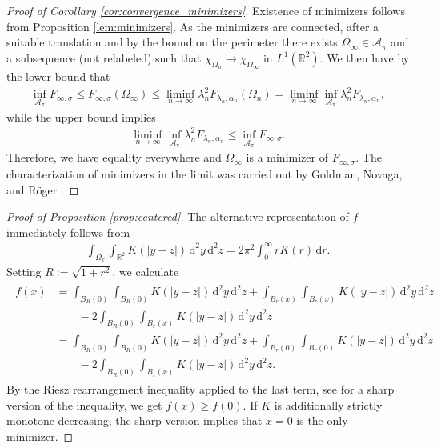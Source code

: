 \documentclass[11pt]{article}
\numberwithin{statement}{section}
\numberwithin{equation}{section}
\theoremstyle{remark}
\newcommand{\R}{\mathbb R} 				%
\newcommand{\intd}{\, \mathrm{d}} 				%
\begin{document}
\begin{proof}[Proof of Corollary \ref{cor:convergence_minimizers}]
  Existence of minimizers follows from Proposition
  \ref{lem:minimizers}.  As the minimizers are connected, after a
  suitable translation and by the bound on the perimeter there exists
  $\Omega_\infty \in \mathcal{A}_\pi$ and a subsequence (not
  relabeled) such that $\chi_{\Omega_n} \to \chi_{\Omega_\infty}$ in
  $L^1(\R^2)$.  We then have by the lower bound that
	\begin{align}
		\inf_{\mathcal{A}_\pi} F_{\infty,\sigma} \leq
          F_{\infty,\sigma}(\Omega_\infty)  \leq \liminf_{n \to
          \infty} \lambda_n^2 F_{\lambda_n, \alpha_n}(\Omega_n) =
          \liminf_{n \to \infty} \inf_{\mathcal{A}_\pi} \lambda_n^2
          F_{\lambda_n, \alpha_n}, 
	\end{align}
	while the upper bound implies
	\begin{align}
          \liminf_{n \to \infty} \inf_{\mathcal{A}_\pi} \lambda_n^2
          F_{\lambda_n, \alpha_n} \leq \inf_{\mathcal{A}_\pi}
          F_{\infty,\sigma}. 
	\end{align}
	Therefore, we have equality everywhere and $\Omega_\infty$ is
        a minimizer of $F_{\infty,\sigma}$.  The characterization of
        minimizers in the limit was carried out by Goldman, Novaga,
        and R{\"o}ger \cite{goldman2020quantitative}.
\end{proof}

\begin{proof}[Proof of Proposition \ref{prop:centered}]
  	The alternative representation of $f$ immediately follows from
	\begin{align}
          \int_{\Omega_x} \int_{\R^2}  K( |y-z|) \intd^2 y \intd^2 z =
          2\pi^2 \int_0^\infty rK(r) \intd r. 
	\end{align}
  	Setting $R := \sqrt{1 + r^2}$, we calculate
	\begin{align}
	  \begin{split}
            f(x) & = \int_{B_R(0)} \int_{B_R(0)} K( |y-z|) \intd^2 y
            \intd^2 z + \int_{B_r(x)} \int_{B_r(x)} K(
            |y-z|) \intd^2 y \intd^2 z\\
            & \qquad - 2 \int_{B_R(0)} \int_{B_r(x)} K( |y-z|)
            \intd^2 y \intd^2 z\\
            & = \int_{B_R(0)} \int_{B_R(0)} K( |y-z|) \intd^2 y
            \intd^2 z + \int_{B_r(0)} \int_{B_r(0)} K(
            |y-z|) \intd^2 y \intd^2 z\\
            & \qquad - 2 \int_{B_R(0)} \int_{B_r(x)} K( |y-z|) \intd^2
            y \intd^2 z.
	  \end{split}
	\end{align}
	By the Riesz rearrangement inequality applied to the last
        term, see \cite[Lemma 3]{lieb1977existence} for a sharp
        version of the inequality, we get $f(x) \geq f(0)$.  If $K$ is
        additionally strictly monotone decreasing, the sharp version
        implies that $x= 0$ is the only minimizer.
  \end{proof}
\end{document}

